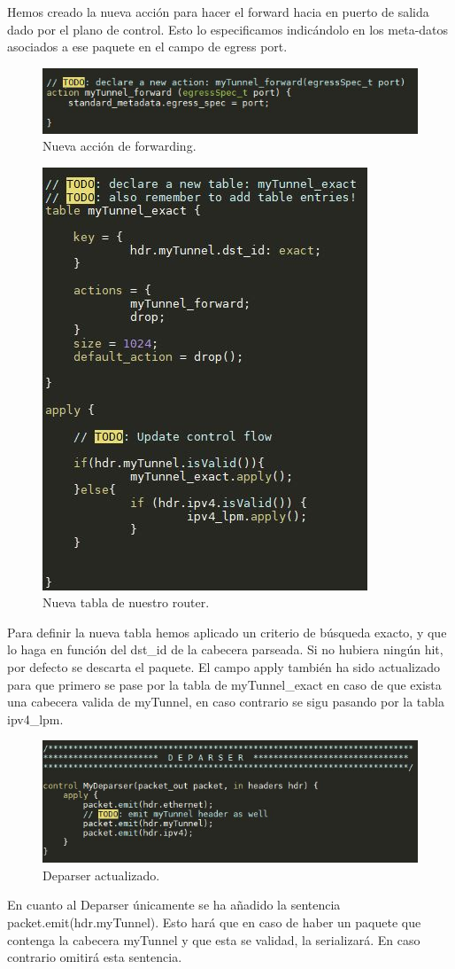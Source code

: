 Hemos creado la nueva acción para hacer el forward hacia en puerto de salida dado por el plano de control. Esto lo especificamos indicándolo en los meta-datos asociados a ese paquete en el campo de egress port.
\begin{figure}[!htb]
  \centering
    \includegraphics[width=0.7\linewidth]{./img/test/10.JPG}
    \caption{Nueva acción de forwarding.}
  \label{fig:yo}
\end{figure}
\newpage
\begin{figure}[!htb]
  \centering
    \includegraphics[width=0.5\linewidth]{./img/test/11.JPG}
    \caption{Nueva tabla de nuestro router.}
  \label{fig:yo}
\end{figure}
Para definir la nueva tabla hemos aplicado un criterio de búsqueda exacto, y que lo haga en función del dst\_id de la cabecera parseada. Si no hubiera ningún hit, por defecto se descarta el paquete. El campo  apply también ha sido actualizado para que primero se pase por la tabla de myTunnel\_exact en caso de que exista una cabecera valida de myTunnel, en caso contrario se sigu pasando por la tabla ipv4\_lpm.\newline
\newline
\begin{figure}[!htb]
  \centering
    \includegraphics[width=0.8\linewidth]{./img/test/12.JPG}
    \caption{Deparser actualizado.}
  \label{fig:yo}
\end{figure}
\newline
En cuanto al Deparser únicamente se ha añadido la sentencia packet.emit(hdr.myTunnel). Esto hará que en caso de haber un paquete que contenga la cabecera myTunnel y que esta se validad, la serializará. En caso contrario omitirá esta sentencia. 
\newpage

